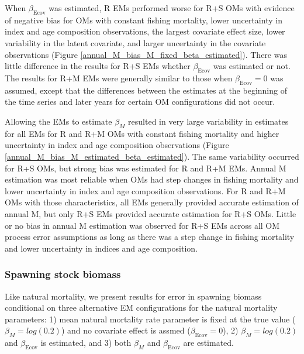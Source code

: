 \documentclass[
  12pt,
]{article}
\begin{document}
When \(\beta_\text{Ecov}\) was estimated, R EMs performed worse for R+S OMs with evidence of negative bias for OMs with constant fishing mortality, lower uncertainty in index and age composition observations, the largest covariate effect size, lower variability in the latent covariate, and larger uncertainty in the covariate observations (Figure \ref{annual_M_bias_M_fixed_beta_estimated}). There was little difference in the results for R+S EMs whether \(\beta_\text{Ecov}\) was estimated or not. The results for R+M EMs were generally similar to those when \(\beta_\text{Ecov}=0\) was assumed, except that the differences between the estimates at the beginning of the time series and later years for certain OM configurations did not occur.

Allowing the EMs to estimate \(\beta_M\) resulted in very large variability in estimates for all EMs for R and R+M OMs with constant fishing mortality and higher uncertainty in index and age composition observations (Figure \ref{annual_M_bias_M_estimated_beta_estimated}). The same variability occurred for R+S OMs, but strong bias was estimated for R and R+M EMs. Annual M estimation was most reliable when OMs had step changes in fishing mortality and lower uncertainty in index and age composition observations. For R and R+M OMs with those characteristics, all EMs generally provided accurate estimation of annual M, but only R+S EMs provided accurate estimation for R+S OMs. Little or no bias in annual M estimation was observed for R+S EMs across all OM process error assumptions as long as there was a step change in fishing mortality and lower uncertainty in indices and age composition.

\hypertarget{spawning-stock-biomass}{%
\subsubsection*{Spawning stock biomass}\label{spawning-stock-biomass}}

Like natural mortality, we present results for error in spawning biomass conditional on three alternative EM configurations for the natural mortality parameters: 1) mean natural mortality rate parameter is fixed at the true value (\(\beta_M = log(0.2)\)) and no covariate effect is assmed (\(\beta_\text{Ecov} = 0\)), 2) \(\beta_M = log(0.2)\) and \(\beta_\text{Ecov}\) is estimated, and 3) both \(\beta_M\) and \(\beta_\text{Ecov}\) are estimated.
\end{document}
